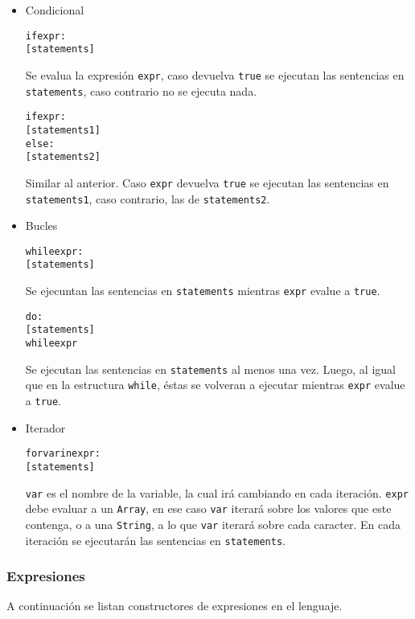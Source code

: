 \documentclass[12pt,a4paper,final]{article}
\begin{document}
\begin{itemize}
\item Condicional
\begin{alltt}
if expr:
  [statements]
\end{alltt}

Se evalua la expresión \texttt{expr}, caso devuelva \texttt{true} se ejecutan las sentencias en \texttt{statements}, caso contrario no se ejecuta nada.

\begin{alltt}
if expr:
  [statements1]
else:
  [statements2]
\end{alltt}

Similar al anterior. Caso \texttt{expr} devuelva \texttt{true} se ejecutan las sentencias en \texttt{statements1}, caso contrario, las de \texttt{statements2}. 

\item Bucles
\begin{alltt}
while expr:
  [statements]
\end{alltt}

Se ejecuntan las sentencias en \texttt{statements} mientras \texttt{expr} evalue a \texttt{true}.

\begin{alltt}
do:
  [statements]
while expr
\end{alltt}

Se ejecutan las sentencias en \texttt{statements} al menos una vez. Luego, al igual que en la estructura \texttt{while}, éstas se volveran a ejecutar mientras \texttt{expr} evalue a \texttt{true}.

\item Iterador
\begin{alltt}
for var in expr:
  [statements]
\end{alltt}

\texttt{var} es el nombre de la variable, la cual irá cambiando en cada iteración. \texttt{expr} debe evaluar a un \texttt{Array}, en ese caso \texttt{var} iterará sobre los valores que este contenga, o a una \texttt{String}, a lo que \texttt{var} iterará sobre cada caracter. En cada iteración se ejecutarán las sentencias en \texttt{statements}.

\end{itemize}

\subsubsection{Expresiones}
A continuación se listan constructores de expresiones en el lenguaje.
\end{document}
